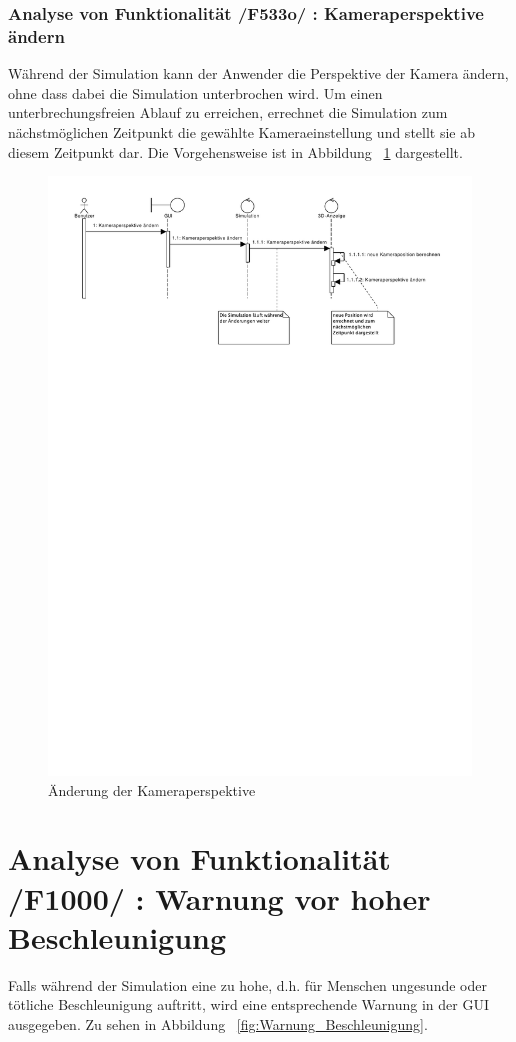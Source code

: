 \subsubsection{Analyse von Funktionalität /F533o/ :  Kameraperspektive ändern}
Während der Simulation kann der Anwender die Perspektive der Kamera ändern, ohne dass dabei die Simulation unterbrochen wird. Um einen unterbrechungsfreien Ablauf zu erreichen, errechnet die Simulation zum nächstmöglichen Zeitpunkt die gewählte Kameraeinstellung und stellt sie ab diesem Zeitpunkt dar. Die Vorgehensweise ist in Abbildung ~\ref{fig:Kameraperspektive} dargestellt.
\begin{figure}[h!]
\includegraphics[viewport = 0 17.5cm 25cm 30cm,width=\linewidth]{bilder/Kameraperspektive.pdf}
\caption{Änderung der Kameraperspektive}
\label{fig:Kameraperspektive}
\end{figure}
\section{Analyse von Funktionalität /F1000/ :  Warnung vor hoher Beschleunigung}
Falls während der Simulation eine zu hohe, d.h. für Menschen ungesunde oder tötliche Beschleunigung auftritt, wird eine entsprechende Warnung in der GUI ausgegeben. Zu sehen in Abbildung ~\ref{fig:Warnung_Beschleunigung}.

